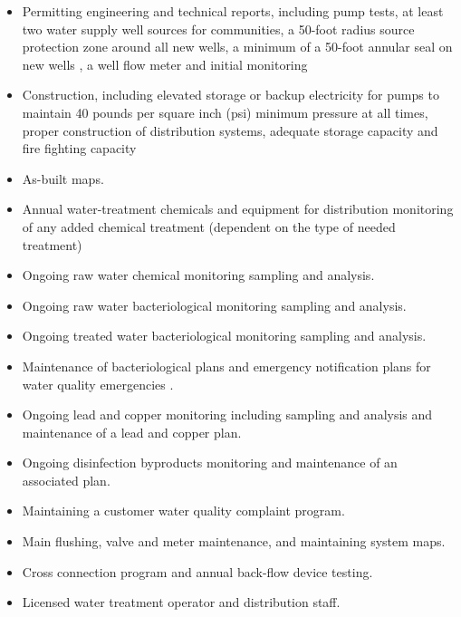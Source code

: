 \begin{itemize}
\begin{itemize}
\item Permitting engineering and technical reports, including pump tests, at least two water supply well sources for communities, a 50-foot radius source protection zone around all new wells, a minimum of a 50-foot annular seal on new wells , a well flow meter and initial monitoring \\
\item  Construction, including elevated storage or backup electricity for pumps to maintain 40 pounds per square inch (psi) minimum pressure at all times, proper construction of distribution systems, adequate storage capacity and fire fighting capacity \\
\item  As-built maps.\\
\item  Annual water-treatment chemicals and equipment for distribution monitoring of any added chemical treatment (dependent on the type of needed treatment) \\
\item  Ongoing raw water chemical monitoring sampling and analysis. \\
\item  Ongoing raw water bacteriological monitoring sampling and analysis. \\
\item  Ongoing treated water bacteriological monitoring sampling and analysis.\\
\item  Maintenance of bacteriological plans and emergency notification plans for water quality emergencies . \\
\item  Ongoing lead and copper monitoring including sampling and analysis and maintenance of a lead and copper plan. \\
\item  Ongoing disinfection byproducts monitoring and maintenance of an associated plan.\\
\item  Maintaining a customer water quality complaint program.\\
\item  Main flushing, valve and meter maintenance, and maintaining system maps.\\
\item  Cross connection program and annual back-flow device testing.\\
\item  Licensed water treatment operator and distribution staff.\\

\end{itemize}
\end{itemize}
